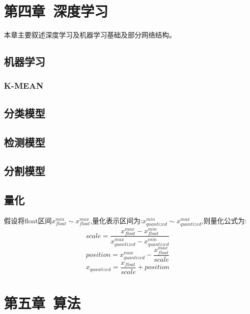 \documentclass[12pt]{book}
\begin{document}
\fancyhead{}

\chapter{第四章\ 深度学习}
本章主要叙述深度学习及机器学习基础及部分网络结构。

\section{机器学习}
\subsection{K-MEAN}
\section{分类模型}
\section{检测模型}
\section{分割模型}
\section{量化}
假设将float区间$x_{float}^{min}\sim x_{float}^{max}$,量化表示区间为:$x_{quantized}^{min}\sim x_{quantized}^{max}$,则量化公式为:
\[scale = \frac{x_{float}^{max} - x_{float}^{min}}{x_{quantized}^{max} - x_{quantized}^{min}}\]
\[position = x_{quantized}^{max} - \frac{x_{float}^{max}}{scale}\]
\[x_{quantized} = \frac{x_{float}}{scale} + position\]


\newpage

\fancyhead{}

\chapter{第五章\ 算法}
\end{document}
